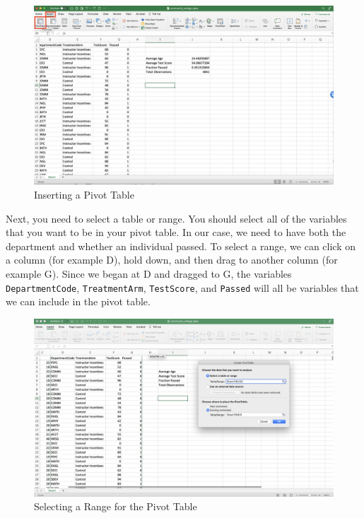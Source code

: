 \documentclass[
]{book}
\begin{document}
\begin{figure}

{\centering \includegraphics[width=1\linewidth]{images/01_pivot1} 

}

\caption{Inserting a Pivot Table}\label{fig:pivot1}
\end{figure}

Next, you need to select a table or range. You should select all of the variables that you want to be in your pivot table. In our case, we need to have both the department and whether an individual passed. To select a range, we can click on a column (for example D), hold down, and then drag to another column (for example G). Since we began at D and dragged to G, the variables \texttt{DepartmentCode}, \texttt{TreatmentArm}, \texttt{TestScore}, and \texttt{Passed} will all be variables that we can include in the pivot table.

\begin{figure}

{\centering \includegraphics[width=1\linewidth]{images/01_pivot3} 

}

\caption{Selecting a Range for the Pivot Table}\label{fig:pivot3}
\end{figure}
\end{document}
